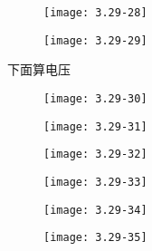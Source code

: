 		\begin{figure}[H] %
	\begin{minipage}{\linewidth}
		\texttt{[image: 3.29-28]}
	\end{minipage}
\end{figure}

		\begin{figure}[H] %
	\begin{minipage}{\linewidth}
		\texttt{[image: 3.29-29]}
	\end{minipage}
\end{figure}

下面算电压

		\begin{figure}[H] %
	\begin{minipage}{\linewidth}
		\texttt{[image: 3.29-30]}
	\end{minipage}
\end{figure}

		\begin{figure}[H] %
	\begin{minipage}{\linewidth}
		\texttt{[image: 3.29-31]}
	\end{minipage}
\end{figure}

		\begin{figure}[H] %
	\begin{minipage}{\linewidth}
		\texttt{[image: 3.29-32]}
	\end{minipage}
\end{figure}

		\begin{figure}[H] %
	\begin{minipage}{\linewidth}
		\texttt{[image: 3.29-33]}
	\end{minipage}
\end{figure}

		\begin{figure}[H] %
	\begin{minipage}{\linewidth}
		\texttt{[image: 3.29-34]}
	\end{minipage}
\end{figure}

		\begin{figure}[H] %
	\begin{minipage}{\linewidth}
		\texttt{[image: 3.29-35]}
	\end{minipage}
\end{figure}

